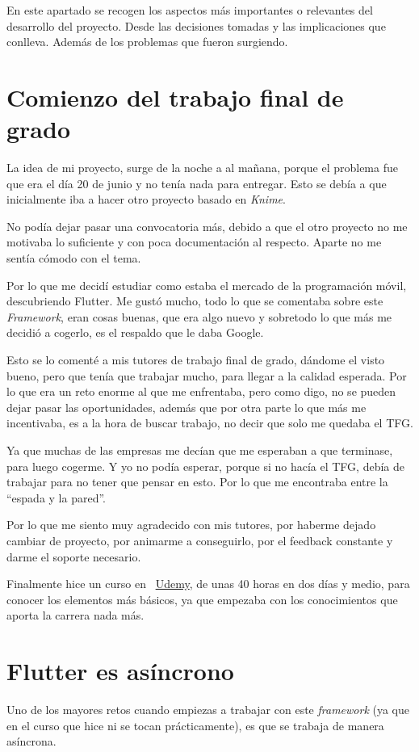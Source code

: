 
En este apartado se recogen los aspectos más importantes o relevantes del desarrollo del proyecto. Desde las decisiones tomadas y las implicaciones que conlleva. Además de los problemas que fueron surgiendo.

\section{Comienzo del trabajo final de grado}
La idea de mi proyecto, surge de la noche a al mañana, porque el problema fue que era el día 20  de junio y no tenía nada para entregar. Esto se debía a que inicialmente iba a hacer otro proyecto basado en \emph{Knime}.

No podía dejar pasar una convocatoria más, debido a que el otro proyecto no me motivaba lo suficiente y con poca documentación al respecto. Aparte no me sentía cómodo con el tema.

Por lo que me decidí estudiar como estaba el mercado de la programación móvil, descubriendo Flutter. Me gustó mucho, todo lo que se comentaba sobre este \emph{Framework}, eran cosas buenas, que era algo nuevo y sobretodo lo que más me decidió a cogerlo, es el respaldo que le daba Google.

Esto se lo comenté a mis tutores de trabajo final de grado, dándome el visto bueno, pero que tenía que trabajar mucho, para llegar a la calidad esperada. Por lo que era un reto enorme al que me enfrentaba, pero como digo, no se pueden dejar pasar las oportunidades, además que por otra parte lo que más me incentivaba, es a la hora de buscar trabajo, no decir que solo me quedaba el TFG. 

Ya que muchas de las empresas me decían que me esperaban a que terminase, para luego cogerme. Y yo no podía esperar, porque si no hacía el TFG, debía de trabajar para no tener que pensar en esto. Por lo que me encontraba entre la ``espada y la pared''.

Por lo que me siento muy agradecido con mis tutores, por haberme dejado cambiar de proyecto, por animarme a conseguirlo, por el feedback constante y darme el soporte necesario.

Finalmente hice un curso en ~\href{https://www.udemy.com/course/flutter-primeros-pasos/}{Udemy}, de unas 40 horas en dos días y medio, para conocer los elementos más básicos, ya que empezaba con los conocimientos que aporta la carrera nada más.

\section{Flutter es asíncrono}
Uno de los mayores retos cuando empiezas a trabajar con este \emph{framework} (ya que en el curso que hice ni se tocan prácticamente), es que se trabaja de manera asíncrona.

